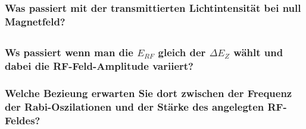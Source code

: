 \subsubsection[]{Was passiert mit der transmittierten Lichtintensität bei null Magnetfeld?}

\subsection{}
\subsubsection[]{Ws passiert wenn man die $E_{RF}$ gleich der $\Delta E_Z$ wählt und dabei die RF-Feld-Amplitude variiert?}
\subsubsection[]{Welche Bezieung erwarten Sie dort zwischen der Frequenz der Rabi-Oszilationen und der Stärke des angelegten RF-Feldes?}